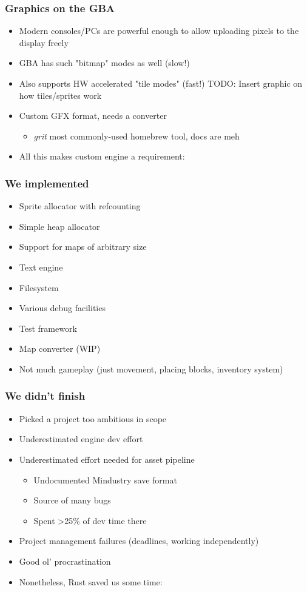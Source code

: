 \documentclass{beamer}
\begin{document}
\begin{frame}
\frametitle{Graphics on the GBA}
\begin{itemize}
	\item Modern consoles/PCs are powerful enough to allow uploading pixels to the display freely
	\item GBA has such "bitmap" modes as well (slow!)
	\item Also supports HW accelerated "tile modes" (fast!)
	TODO: Insert graphic on how tiles/sprites work
	\item Custom GFX format, needs a converter \begin{itemize}
		\item \emph{grit} most commonly-used homebrew tool, docs are meh
	\end{itemize}
    \item All this makes custom engine a requirement:
\end{itemize}
\end{frame}

\begin{frame}
    \frametitle{We implemented}
    \begin{itemize}
	    \item Sprite allocator with refcounting
	    \item Simple heap allocator
	    \item Support for maps of arbitrary size
	    \item Text engine
	    \item Filesystem
	    \item Various debug facilities
	    \item Test framework
	    \item Map converter (WIP)
	    \item Not much gameplay (just movement, placing blocks, inventory system)
	\end{itemize}
\end{frame}

\begin{frame}
\frametitle{We didn't finish}
\begin{itemize}
	\item Picked a project too ambitious in scope
	\item Underestimated engine dev effort
    \item Underestimated effort needed for asset pipeline \begin{itemize}
    	\item Undocumented Mindustry save format 
    	\item Source of many bugs
    	\item Spent >25\% of dev time there
    \end{itemize}
    \item Project management failures (deadlines, working independently)
	\item Good ol' procrastination
	\item Nonetheless, Rust saved us some time:
\end{itemize}
\end{frame}
\end{document}
